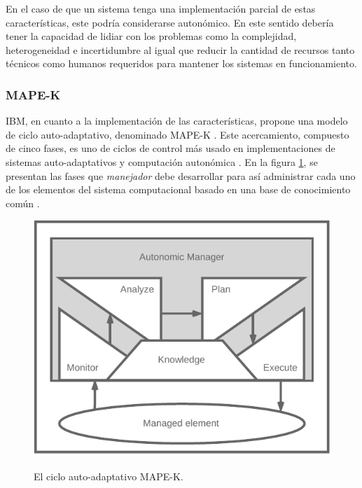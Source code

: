 En el caso de que un sistema tenga una implementación parcial de estas características, este podría considerarse autonómico. En este sentido debería tener la capacidad de lidiar con los problemas como la complejidad, heterogeneidad e incertidumbre \cite{emerging_2005} al igual que reducir la cantidad de recursos tanto técnicos como humanos requeridos para mantener los sistemas en funcionamiento.

\subsubsection{MAPE-K}


IBM, en cuanto a la implementación de las características, propone una modelo de ciclo auto-adaptativo, denominado MAPE-K \cite{Krikava2013}. Este acercamiento, compuesto de cinco fases, es uno de ciclos de control más usado en implementaciones de sistemas auto-adaptativos y computación autonómica \cite{Arcaini_2015}. En la figura \ref{fig:mapek}, se presentan las fases que \textit{manejador} debe desarrollar para así administrar cada uno de los elementos del sistema computacional basado en una base de conocimiento común \cite{alessandra_2010}. 

\begin{figure}[H]
    \centering
    \caption{El ciclo auto-adaptativo MAPE-K.} 
    \vspace{-2mm}
    \cite{alessandra_2010}
    \vspace{4mm}
    
    \includegraphics[width=0.8\linewidth]{images/mape-k.pdf}
    \label{fig:mapek}
\end{figure}

